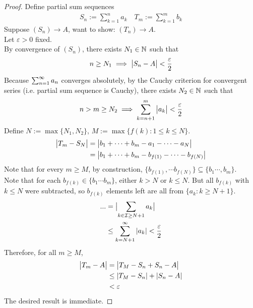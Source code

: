 \documentclass[11pt]{article}
\begin{document}
	\begin{proof}
		Define partial sum sequences
		\begin{align}
			S_n := \sum_{k=1}^n a_k \quad
			T_m := \sum_{k=1}^m b_k
		\end{align}
		Suppose $(S_n) \to A$, want to show: $(T_n) \to A$.\\
		Let $\varepsilon > 0$ fixed. \\
		By convergence of $(S_n)$, there exists $N_1 \in \mathbb{N}$ such that
		\begin{align}
			n \geq N_1 \implies \big \vert {S_n - A} \big \vert < \frac{\varepsilon}{2}
		\end{align}
		Because $\sum_{{n}=1}^\infty {a}_{n}$ converges absolutely, by the Cauchy criterion for convergent series (i.e. partial sum sequence is Cauchy), there exists $N_2 \in \mathbb{N}$ such that
		\begin{align}
			n > m \geq N_2 \implies \sum_{k=n+1}^m \big \vert {a_k} \big \vert < \frac{\varepsilon}{2}
		\end{align}
		Define $N := \max\{N_1, N_2\}$, $M := \max\{f(k): 1 \leq k \leq N\}$.
		\begin{align}
			\big \vert {T_m - S_N} \big \vert &= \big \vert {b_1 + \cdots + b_m - a_1 - \cdots - a_N} \big \vert \\
			&= \big \vert {b_1 + \cdots + b_m	 - b_{f(1)} - \cdots - b_{f(N)}} \big \vert
		\end{align}
		Note that for every $m \geq M$,
		by construction, $\{b_{f(1)}, \cdots b_{f(N)}\} \subseteq \{b_1 \cdots, b_m\}$. \\
		Note that for each $b_{f(k)} \in \{b_1 \cdots b_m\}$, either $k > N$ or $k \leq N$. But all $b_{f(k)}$ with $k \leq N$ were subtracted, so $b_{f(k)}$ elements left are all from $\{a_k: k \geq N+1\}$.
		\begin{align}
			... &= \big \vert {\sum_{k \in \mathcal{{I}} \geq N + 1} a_k} \big \vert \\
			&\leq \sum_{k=N+1}^\infty |a_k| < \frac{\varepsilon}{2}
		\end{align}
		Therefore, for all $m \geq M$, 
		\begin{align}
			\big \vert {T_m - A} \big \vert &= \big \vert {T_M - S_n + S_n - A} \big \vert \\
			&\leq |T_M - S_n| + |S_n - A| \\
			&< \varepsilon
		\end{align}
		The desired result is immediate.
	\end{proof}
	
\end{document}

